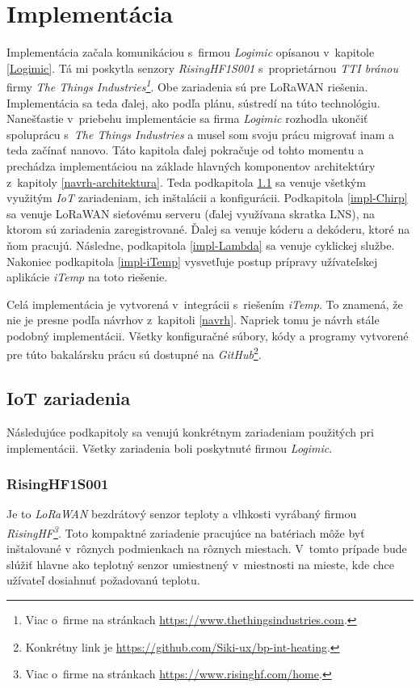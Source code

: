 \chapter{Implementácia}\label{impl}
Implementácia začala komunikáciou s~firmou \emph{Logimic} opísanou v~kapitole \ref{Logimic}. Tá mi poskytla senzory \emph{RisingHF1S001} s~proprietárnou \emph{TTI bránou} firmy \emph{The Things Industries\footnote{Viac o~firme na stránkach \url{https://www.thethingsindustries.com}.}}. 
Obe zariadenia sú pre LoRaWAN riešenia. 
Implementácia sa teda ďalej, ako podľa plánu, sústredí na túto technológiu. 
Nanešťastie v~priebehu implementácie sa firma \emph{Logimic} rozhodla ukončiť spoluprácu s~\emph{The Things Industries} a musel som svoju prácu migrovať inam a teda začínať nanovo. 
Táto kapitola ďalej pokračuje od tohto momentu a prechádza implementáciou na základe hlavných komponentov architektúry z~kapitoly \ref{navrh-architektura}. 
Teda podkapitola \ref{impl-IOT} sa venuje všetkým využitým \emph{IoT} zariadeniam, ich inštalácii a konfigurácii. 
Podkapitola \ref{impl-Chirp} sa venuje LoRaWAN sieťovému serveru (ďalej využívana skratka LNS), na ktorom sú zariadenia zaregistrované. Ďalej sa venuje kóderu a dekóderu, ktoré na ňom pracujú. 
Následne, podkapitola \ref{impl-Lambda} sa venuje cyklickej službe. Nakoniec podkapitola \ref{impl-iTemp} vysvetľuje postup prípravy užívateľskej aplikácie \emph{iTemp} na toto riešenie.

Celá implementácia je vytvorená v~integrácii s~riešením \emph{iTemp}. To znamená, že nie je presne podľa návrhov z~kapitoli \ref{navrh}. 
Napriek tomu je návrh stále podobný implementácii. Všetky konfiguračné súbory, kódy a programy vytvorené pre túto bakalársku prácu sú dostupné na \emph{GitHub}\footnote{Konkrétny link je \url{https://github.com/Siki-ux/bp-int-heating}.}.


\section{IoT zariadenia}\label{impl-IOT}
Následujúce podkapitoly sa venujú konkrétnym zariadeniam použitých pri implementácii. Všetky zariadenia boli poskytnuté firmou \emph{Logimic}.
\subsection{RisingHF1S001}\label{impl-Rising}
Je to \emph{LoRaWAN} bezdrátový senzor teploty a vlhkosti vyrábaný firmou \emph{RisingHF\footnote{Viac o~firme na stránkach \url{https://www.risinghf.com/home}.}}. 
Toto kompaktné zariadenie pracujúce na batériach môže byť inštalované v~rôznych podmienkach na rôznych miestach. 
V~tomto prípade bude slúžiť hlavne ako teplotný senzor umiestnený v~miestnosti na mieste, kde chce užívateľ dosiahnuť požadovanú teplotu.
